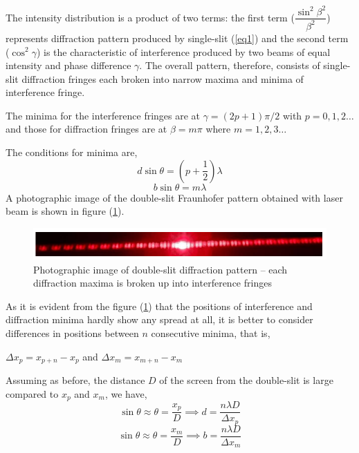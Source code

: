 \documentclass{article}
\begin{document}
The intensity distribution is a product of two terms: the first term ($\dfrac{\sin^2 \beta^2}{\beta^2}$) represents diffraction pattern produced by single-slit (\ref{eq1}) and the second term ($\cos^2 \gamma$) is the characteristic of interference produced by two beams of equal intensity and phase difference $\gamma$. The overall pattern, therefore, consists of single-slit diffraction fringes each broken into narrow maxima and minima of interference fringe.
\par
\noindent
The minima for the interference fringes are at $\gamma = (2p + 1)\pi/2$ with $p = 0, 1, 2 \ldots$ and those for diffraction fringes are at $\beta = m \pi$ where $m = 1, 2, 3 \ldots$ 
\par
\noindent
The conditions for minima are,
\begin{equation}
    d \sin \theta = (p + \dfrac{1}{2})\lambda
\end{equation}
\begin{equation}
    b \sin \theta = m \lambda
\end{equation}
A photographic image of the double-slit Fraunhofer pattern obtained with laser beam is shown in figure (\ref{fig:dblphoto}).

\begin{figure}[h!]
    \centering
    \includegraphics[scale = 0.9]{Figures/dblphoto.png}
    \captionsetup{justification=centering}
    \caption{Photographic image of double-slit diffraction pattern – each diffraction maxima is broken up into interference fringes}
    \label{fig:dblphoto}
\end{figure}
\noindent
As it is evident from the figure (\ref{fig:dblphoto}) that the positions of interference and diffraction minima hardly show any spread at all, it is better to consider differences in positions between $n$ consecutive minima, that is,
\begin{center}
    $\Delta x_p = x_{p+n} - x_p$ and $\Delta x_m = x_{m+n} - x_m$
\end{center}
\noindent
Assuming as before, the distance $D$ of the screen from the double-slit is large compared to $x_p$ and $x_m$, we have, 
\begin{equation}
    \sin \theta \approx \theta = \dfrac{x_p}{D} \implies \boxed{d = \dfrac{n \lambda D}{\Delta x_p}}
\end{equation}
\begin{equation}
    \sin \theta \approx \theta = \dfrac{x_m}{D} \implies \boxed{b = \dfrac{n \lambda D}{\Delta x_m}}
\end{equation}
\end{document}

